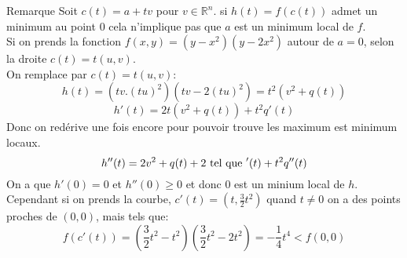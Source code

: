\begin{parag}{Remarque}
    Soit $c\left(t\right) = a + tv$ pour $v \in \mathbb{R}^n$. si $h\left(t\right) = f\left(c\left(t\right)\right)$ admet un minimum au point $0$ cela n'implique pas que $a$ est un minimum local de $f$.\\
    Si on prends la fonction $f\left(x, y\right) = \left(y-x^2\right)\left(y-2x^2\right)$ autour de $a = 0$, selon la droite $c\left(t\right) = t\left(u, v\right)$.\\
    On remplace par $c\left(t\right) = t\left(u, v\right)$:
    \begin{equation*} h\left(t\right) = \left(tv . \left(tu\right)^2\right)\left(tv - 2\left(tu\right)^2\right) = t^2\left(v^2 + q\left(t\right)\right) \end{equation*}
    \begin{equation*} h'\left(t\right) = 2t\left(v^2 + q\left(t\right)\right) + t^2q'\left(t\right) \end{equation*}
    Donc on redérive une fois encore pour pouvoir trouve les maximum est minimum locaux.
    \begin{equation*} h''\left(t\right) = 2v^2 + q\left(t\right) + 2\telque'\left(t\right) + t^2 q''\left(t\right) \end{equation*}
    On a que $h'\left(0\right) = 0$ et $h''\left(0\right) \geq 0$ et donc $0$ est un minium local de $h$.\\
    Cependant si on prends la courbe, $c'\left(t\right) = \left(t, \frac{3}{2}t^2\right)$ quand $t \neq 0$ on a des points proches de $\left(0, 0\right)$, mais tels que:
    \begin{equation*} f\left(c'\left(t\right)\right) = \left(\frac{3}{2}t^2 - t^2\right)\left(\frac{3}{2}t^2 - 2t^2\right) = -\frac{1}{4}t^4 < f\left(0, 0\right) \end{equation*}
    
    
\end{parag}

